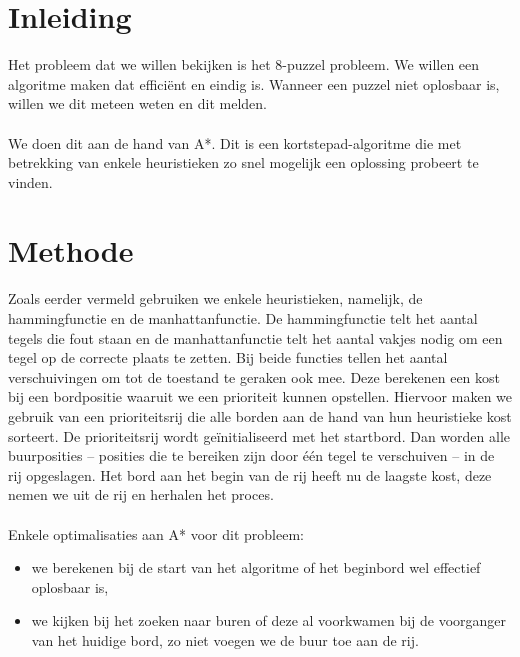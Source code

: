 \documentclass[a4paper]{article}
\numberwithin{equation}{section}
\begin{document}
    \graphicspath{}

    


    \tableofcontents
    \listoffigures
    \listoftables

    \pagebreak
    \section{Inleiding}
        Het probleem dat we willen bekijken is het 8-puzzel probleem. 
        We willen een algoritme maken dat efficiënt en eindig is. 
        Wanneer een puzzel niet oplosbaar is, willen we dit meteen weten en dit melden.
        \\
        \\We doen dit aan de hand van A*. Dit is een kortstepad-algoritme die met betrekking van enkele heuristieken zo snel mogelijk een oplossing probeert te vinden.

    \section{Methode}
        Zoals eerder vermeld gebruiken we enkele heuristieken, namelijk, de hammingfunctie en de manhattanfunctie.
        De hammingfunctie telt het aantal tegels die fout staan en de manhattanfunctie telt het aantal vakjes nodig om een tegel op de correcte plaats te zetten.
        Bij beide functies tellen het aantal verschuivingen om tot de toestand te geraken ook mee.
        Deze berekenen een kost bij een bordpositie waaruit we een prioriteit kunnen opstellen.
        Hiervoor maken we gebruik van een prioriteitsrij die alle borden aan de hand van hun heuristieke kost sorteert.
        De prioriteitsrij wordt ge\"initialiseerd met het startbord. Dan worden alle buurposities -- posities die te bereiken zijn door \'e\'en tegel te verschuiven -- in de rij opgeslagen.
        Het bord aan het begin van de rij heeft nu de laagste kost, deze nemen we uit de rij en herhalen het proces.
        \\
        \\Enkele optimalisaties aan A* voor dit probleem:
        \begin{itemize}
            \item we berekenen bij de start van het algoritme of het beginbord wel effectief oplosbaar is,
            \item we kijken bij het zoeken naar buren of deze al voorkwamen bij de voorganger van het huidige bord, zo niet voegen we de buur toe aan de rij.
        \end{itemize}
\end{document}
